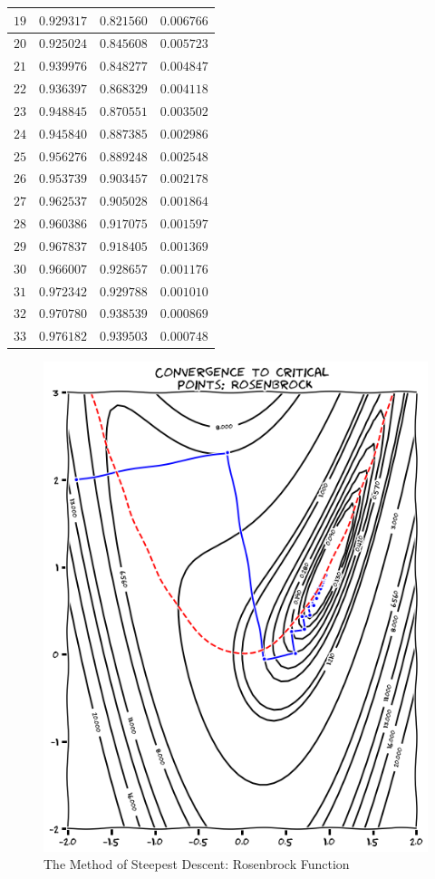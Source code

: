 \begin{example}
\begin{center}
\begin{tabular}{|r|r|r|r|}
$19$ & $0.929317$ & $0.821560$ & $0.006766$ \\ \hline 
$20$ & $0.925024$ & $0.845608$ & $0.005723$ \\ \hline 
$21$ & $0.939976$ & $0.848277$ & $0.004847$ \\ \hline 
$22$ & $0.936397$ & $0.868329$ & $0.004118$ \\ \hline 
$23$ & $0.948845$ & $0.870551$ & $0.003502$ \\ \hline 
$24$ & $0.945840$ & $0.887385$ & $0.002986$ \\ \hline 
$25$ & $0.956276$ & $0.889248$ & $0.002548$ \\ \hline 
$26$ & $0.953739$ & $0.903457$ & $0.002178$ \\ \hline 
$27$ & $0.962537$ & $0.905028$ & $0.001864$ \\ \hline 
$28$ & $0.960386$ & $0.917075$ & $0.001597$ \\ \hline 
$29$ & $0.967837$ & $0.918405$ & $0.001369$ \\ \hline 
$30$ & $0.966007$ & $0.928657$ & $0.001176$ \\ \hline 
$31$ & $0.972342$ & $0.929788$ & $0.001010$ \\ \hline 
$32$ & $0.970780$ & $0.938539$ & $0.000869$ \\ \hline 
$33$ & $0.976182$ & $0.939503$ & $0.000748$ \\ \hline 
\end{tabular}
\end{center}
\end{example}

\begin{figure}[ht!]
\includegraphics[width=0.6\linewidth]{images/SDR3.png}
\caption{The Method of Steepest Descent: Rosenbrock Function}
\label{figure:SteepestConvergenceR}
\end{figure}

